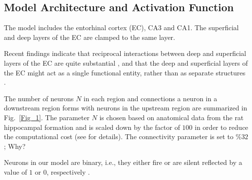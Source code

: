 \documentclass[utf8]{frontiersSCNS} %
\begin{document}
\subsection*{Model Architecture and Activation Function}


The model includes the entorhinal cortex (EC), CA3 and CA1. The superficial and deep layers of the EC are clamped to the same layer. 


Recent findings indicate that reciprocal interactions between deep and superficial layers of the EC are quite substantial \cite{canto2008does}, and that the deep and superficial layers of the EC might act as a single functional entity, rather than as separate structures \cite{kloosterman2000functional}.

The number of neurons $N$ in each region and connections a neuron in a downstream region forms with neurons in the upstream region are summarized in Fig.~\ref{Fig_1}. The parameter $N$ is chosen based on anatomical data from the rat hippocampal formation \cite{amaral1990chapter, cutsuridis2010hippocampal} and is scaled down by the factor of $100$ in order to reduce the computational cost (see \cite{neher2015memory} for details). The connectivity parameter is set to $\% 32$; Why? 


Neurons in our model are binary, i.e., they either fire or are silent reflected by a value of $1$ or $0$, respectively \cite{fontanari1995model}.
\end{document}

